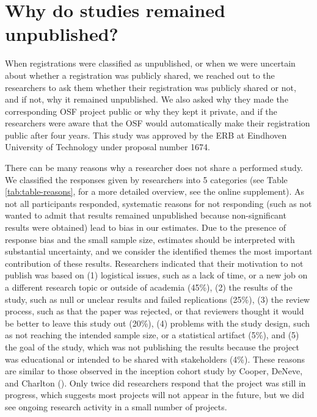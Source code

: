 \documentclass[
  ,man, a4paper,floatsintext]{apa6}
\begin{document}
\section{Why do studies remained unpublished?}\label{why-do-studies-remained-unpublished}

When registrations were classified as unpublished, or when we were uncertain about whether a registration was publicly shared, we reached out to the researchers to ask them whether their registration was publicly shared or not, and if not, why it remained unpublished. We also asked why they made the corresponding OSF project public or why they kept it private, and if the researchers were aware that the OSF would automatically make their registration public after four years. This study was approved by the ERB at Eindhoven University of Technology under proposal number 1674.

There can be many reasons why a researcher does not share a performed study. We classified the responses given by researchers into 5 categories (see Table \ref{tab:table-reasons}, for a more detailed overview, see the online supplement). As not all participants responded, systematic reasons for not responding (such as not wanted to admit that results remained unpublished because non-significant results were obtained) lead to bias in our estimates. Due to the presence of response bias and the small sample size, estimates should be interpreted with substantial uncertainty, and we consider the identified themes the most important contribution of these results. Researchers indicated that their motivation to not publish was based on (1) logistical issues, such as a lack of time, or a new job on a different research topic or outside of academia (45\%), (2) the results of the study, such as null or unclear results and failed replications (25\%), (3) the review process, such as that the paper was rejected, or that reviewers thought it would be better to leave this study out (20\%), (4) problems with the study design, such as not reaching the intended sample size, or a statistical artifact (5\%), and (5) the goal of the study, which was not publishing the results because the project was educational or intended to be shared with stakeholders (4\%). These reasons are similar to those observed in the inception cohort study by Cooper, DeNeve, and Charlton (). Only twice did researchers respond that the project was still in progress, which suggests most projects will not appear in the future, but we did see ongoing research activity in a small number of projects.
\end{document}
